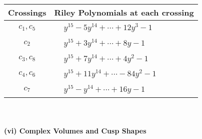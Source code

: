 \documentclass[1p]{elsarticle_modified}
\theoremstyle{definition}
\begin{document}
\begin{tabular}{m{50pt}|m{274pt}}
Crossings & \hspace{64pt}Riley Polynomials at each crossing \\
\hline $$\begin{aligned}c_{1},c_{5}\end{aligned}$$&$\begin{aligned}
&y^{15}-5 y^{14}+\cdots+12 y^3-1
\end{aligned}$\\
\hline $$\begin{aligned}c_{2}\end{aligned}$$&$\begin{aligned}
&y^{15}+3 y^{14}+\cdots+8 y-1
\end{aligned}$\\
\hline $$\begin{aligned}c_{3},c_{8}\end{aligned}$$&$\begin{aligned}
&y^{15}+7 y^{14}+\cdots+4 y^2-1
\end{aligned}$\\
\hline $$\begin{aligned}c_{4},c_{6}\end{aligned}$$&$\begin{aligned}
&y^{15}+11 y^{14}+\cdots-84 y^2-1
\end{aligned}$\\
\hline $$\begin{aligned}c_{7}\end{aligned}$$&$\begin{aligned}
&y^{15}- y^{14}+\cdots+16 y-1
\end{aligned}$\\
\hline
\end{tabular}\\~\\
\newpage\flushleft \textbf{(vi) Complex Volumes and Cusp Shapes}
\end{document}
